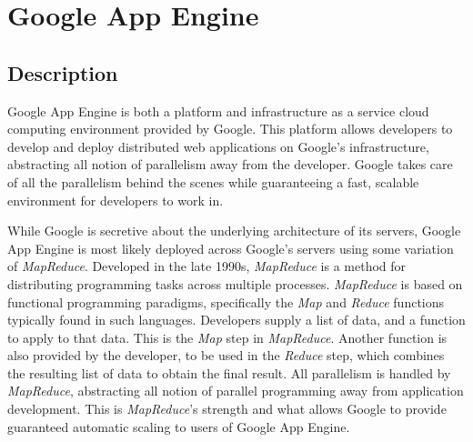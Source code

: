 \newcommand{\gae}[0]{Google App Engine}
\newcommand{\mr}[0]{\emph{MapReduce}}
\chapter{Google App Engine}

\section{Description}
\gae{} is both a platform and infrastructure as a service cloud computing environment provided by Google. This platform allows developers to develop and deploy distributed web applications on Google's infrastructure, abstracting all notion of parallelism away from the developer. Google takes care of all the parallelism behind the scenes while guaranteeing a fast, scalable environment for developers to work in\ftGAEOne.\ftGAEOneText

While Google is secretive about the underlying architecture of its servers, \gae{} is most likely deployed across Google's servers using some variation of \mr{}. Developed in the late 1990s, \mr{} is a method for distributing programming tasks across multiple processes. \mr{} is based on functional programming paradigms, specifically the \emph{Map} and \emph{Reduce} functions typically found in such languages. Developers supply a list of data, and a function to apply to that data. This is the \emph{Map} step in \mr{}. Another function is also provided by the developer, to be used in the \emph{Reduce} step, which combines the resulting list of data to obtain the final result. All parallelism is handled by \mr{}, abstracting all notion of parallel programming away from application development. This is \mr{}'s strength and what allows Google to provide guaranteed automatic scaling to users of \gae{}.~\cite{MapReduce}

%

